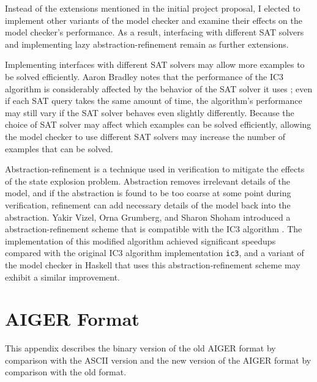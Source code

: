 \documentclass[12pt,a4paper,twoside,openright]{report}
\begin{document}
{Instead of the extensions mentioned in the initial project proposal,
I elected to implement other variants of the model checker and examine their
effects on the model checker's performance.
As a result, interfacing with different SAT solvers and implementing lazy
abstraction-refinement remain as further extensions.

Implementing interfaces with different SAT solvers may allow more examples to be solved efficiently.
Aaron Bradley notes that the performance of the IC3 algorithm is considerably affected
by the behavior of the SAT solver it uses \cite{bradley12}; even if each SAT query takes the same amount of
time, the algorithm's performance may still vary if the SAT solver behaves even slightly differently.
Because the choice of SAT solver may affect which examples can be solved efficiently, allowing the model
checker to use different SAT solvers may increase the number of examples that can be solved.

Abstraction-refinement is a technique used in verification to mitigate the effects
of the state explosion problem. Abstraction removes irrelevant details of the model,
and if the abstraction is found to be too coarse at some point during verification,
refinement can add necessary details of the model back into the abstraction.
Yakir Vizel, Orna Grumberg, and Sharon Shoham introduced a abstraction-refinement
scheme that is compatible with the IC3 algorithm \cite{vizel12}. The implementation
of this modified algorithm achieved significant speedups compared with the
original IC3 algorithm implementation \verb,ic3,, and a variant
of the model checker in Haskell that uses this abstraction-refinement scheme may 
exhibit a similar improvement.



\appendix

\chapter{AIGER Format}
\label{aiger}
This appendix describes the binary version of the old AIGER format by comparison
with the ASCII version and the new version of the AIGER format by
comparison with the old format.

}
\end{document}
